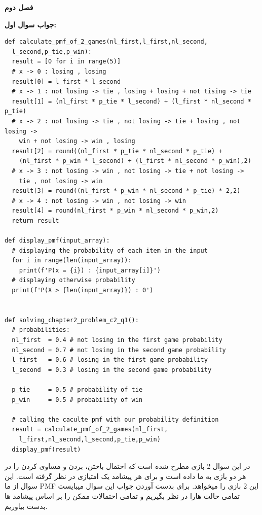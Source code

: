 \documentclass[a4paper,14pt]{article}
\begin{document}
	\begin{center}
		{\LARGE
			\textbf{فصل دوم}
		}
	\end{center}

	\textbf{جواب سوال اول:}\\
	
	\fontsize{11}{11}\selectfont
	\begin{latin}
		\begin{lstlisting}
def calculate_pmf_of_2_games(nl_first,l_first,nl_second,
  l_second,p_tie,p_win):
  result = [0 for i in range(5)]
  # x -> 0 : losing , losing
  result[0] = l_first * l_second 
  # x -> 1 : not losing -> tie , losing + losing + not tising -> tie
  result[1] = (nl_first * p_tie * l_second) + (l_first * nl_second * p_tie)
  # x -> 2 : not losing -> tie , not losing -> tie + losing , not losing ->
    win + not losing -> win , losing
  result[2] = round((nl_first * p_tie * nl_second * p_tie) +
    (nl_first * p_win * l_second) + (l_first * nl_second * p_win),2)
  # x -> 3 : not losing -> win , not losing -> tie + not losing -> 
    tie , not losing -> win
  result[3] = round((nl_first * p_win * nl_second * p_tie) * 2,2)
  # x -> 4 : not losing -> win , not losing -> win
  result[4] = round(nl_first * p_win * nl_second * p_win,2)
  return result

def display_pmf(input_array):
  # displaying the probability of each item in the input
  for i in range(len(input_array)):
    print(f'P(x = {i}) : {input_array[i]}')
  # displaying otherwise probability 
  print(f'P(X > {len(input_array)}) : 0')


def solving_chapter2_problem_c2_q1():
  # probabilities:
  nl_first  = 0.4 # not losing in the first game probability
  nl_second = 0.7 # not losing in the second game probability
  l_first   = 0.6 # losing in the first game probability 
  l_second  = 0.3 # losing in the second game probability 

  p_tie     = 0.5 # probability of tie
  p_win     = 0.5 # probability of win

  # calling the caculte pmf with our probability definition
  result = calculate_pmf_of_2_games(nl_first,
    l_first,nl_second,l_second,p_tie,p_win)
  display_pmf(result)
		\end{lstlisting}
	\end{latin}
		\fontsize{14}{14}\selectfont
	
	در این سوال 2 بازی مطرح شده است که احتمال باختن، بردن و مساوی کردن را در هر دو بازی به ما داده است و برای هر پیشامد یک امتیازی در نظر گرفته است. این سوال از ما PMF این 2 بازی را میخواهد. برای بدست آوردن جواب این سوال میبایست تمامی حالت هارا در نظر بگیریم و تمامی احتمالات ممکن را بر اساس پیشامد ها بدست بیاوریم.\\
	
\end{document}
